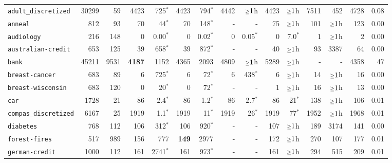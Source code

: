 \begin{tabular}{lccrrrrrrrrrrrr}
\texttt{adult\_discretized} & \multicolumn{1}{r}{30299} & \multicolumn{1}{r}{59}  & 4423 & 725$^*$ & 4423 & 794$^*$ & 4442 & $\mathsmaller{\geq}1$h & 4423 & $\mathsmaller{\geq}1$h & 7511 & 452 & 4728 & 0.08\\
\texttt{anneal} & \multicolumn{1}{r}{812} & \multicolumn{1}{r}{93}  & 70 & 44$^*$ & 70 & 148$^*$ & - & - & 75 & $\mathsmaller{\geq}1$h & 101 & $\mathsmaller{\geq}1$h & 123 & 0.00\\
\texttt{audiology} & \multicolumn{1}{r}{216} & \multicolumn{1}{r}{148}  & 0 & 0.00$^*$ & 0 & 0.02$^*$ & 0 & 0.05$^*$ & 0 & 7.0$^*$ & 1 & $\mathsmaller{\geq}1$h & 2 & 0.00\\
\texttt{australian-credit} & \multicolumn{1}{r}{653} & \multicolumn{1}{r}{125}  & 39 & 658$^*$ & 39 & 872$^*$ & - & - & 40 & $\mathsmaller{\geq}1$h & 93 & 3387 & 64 & 0.00\\
\texttt{bank} & \multicolumn{1}{r}{45211} & \multicolumn{1}{r}{9531}  & \textbf{4187} & 1152 & 4365 & 2093 & 4809 & $\mathsmaller{\geq}1$h & 5289 & $\mathsmaller{\geq}1$h & - & - & 4358 & 47\\
\texttt{breast-cancer} & \multicolumn{1}{r}{683} & \multicolumn{1}{r}{89}  & 6 & 725$^*$ & 6 & 72$^*$ & 6 & 438$^*$ & 6 & $\mathsmaller{\geq}1$h & 14 & $\mathsmaller{\geq}1$h & 16 & 0.00\\
\texttt{breast-wisconsin} & \multicolumn{1}{r}{683} & \multicolumn{1}{r}{120}  & 0 & 20$^*$ & 0 & 72$^*$ & - & - & 1 & $\mathsmaller{\geq}1$h & 16 & $\mathsmaller{\geq}1$h & 13 & 0.00\\
\texttt{car} & \multicolumn{1}{r}{1728} & \multicolumn{1}{r}{21}  & 86 & 2.4$^*$ & 86 & 1.2$^*$ & 86 & 2.7$^*$ & 86 & 21$^*$ & 138 & $\mathsmaller{\geq}1$h & 106 & 0.01\\
\texttt{compas\_discretized} & \multicolumn{1}{r}{6167} & \multicolumn{1}{r}{25}  & 1919 & 1.1$^*$ & 1919 & 11$^*$ & 1919 & 26$^*$ & 1919 & 77$^*$ & 1952 & $\mathsmaller{\geq}1$h & 1968 & 0.01\\
\texttt{diabetes} & \multicolumn{1}{r}{768} & \multicolumn{1}{r}{112}  & 106 & 312$^*$ & 106 & 920$^*$ & - & - & 107 & $\mathsmaller{\geq}1$h & 189 & 3174 & 141 & 0.00\\
\texttt{forest-fires} & \multicolumn{1}{r}{517} & \multicolumn{1}{r}{989}  & 156 & 777 & \textbf{149} & 2977 & - & - & 172 & $\mathsmaller{\geq}1$h & 270 & 107 & 177 & 0.01\\
\texttt{german-credit} & \multicolumn{1}{r}{1000} & \multicolumn{1}{r}{112}  & 161 & 2741$^*$ & 161 & 973$^*$ & - & - & 161 & $\mathsmaller{\geq}1$h & 294 & 515 & 209 & 0.01\\

\end{tabular}
